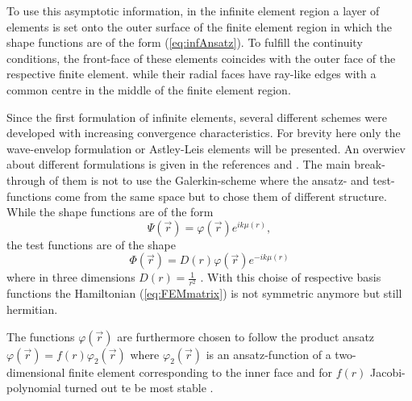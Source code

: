 To use this asymptotic information, in the infinite element region a layer of elements is set onto the outer surface of the finite element region in which the shape functions are of the form (\ref{eq:infAnsatz}).
To fulfill the continuity conditions, the front-face of these elements coincides with the outer face of the respective finite element. while their radial faces have ray-like edges with a common centre in the middle of the finite element region.

Since the first formulation of infinite elements, several different schemes were developed with increasing convergence characteristics.
For brevity here only the wave-envelop formulation or Astley-Leis elements will be presented.
An overwiev about different formulations is given in the references \cite{dreyer} and \cite{Astley}.
The main break-through of them is not to use the Galerkin-scheme where the ansatz- and test-functions come from the same space but to chose them of different structure.
While the shape functions are of the form
\begin{equation}
 \Psi(\vec{r}) = \varphi(\vec{r}) e^{ik \mu(r)},
\end{equation}
the test functions are of the shape
\begin{equation}
 \Phi(\vec{r}) = D(r)\varphi(\vec{r}) e^{-ik\mu(r)}
\end{equation}
where in three dimensions $D(r)=\frac{1}{r^2}$ \cite{astley2}.
With this choise of respective basis functions the Hamiltonian (\ref{eq:FEMmatrix}) is not symmetric anymore but still hermitian.

The functions $\varphi(\vec{r})$ are furthermore chosen to follow the product ansatz $\varphi(\vec{r})=f(r)\varphi_2(\vec{r})$ where $\varphi_2(\vec{r})$ is an ansatz-function of a two-dimensional finite element corresponding to the inner face and  for $f(r)$ Jacobi-polynomial turned out te be most stable \cite{dreyer_improved}.

